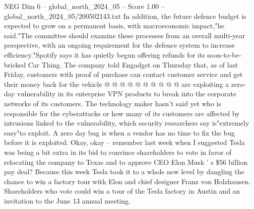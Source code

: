\begin{textsample}{NEG Dim 6 – global\_north\_2024\_05 – Score 1.00 – global\_north\_2024\_05/200502143.txt}
In addition, the future defence budget is expected to grow on a permanent basis, with macroeconomic impact,"he said."The committee should examine these processes from an overall multi-year perspective, with an ongoing requirement for the defence system to increase efficiency."Spotify says it has quietly begun offering refunds for its soon-to-be-bricked Car Thing.
The company told Engadget on Thursday that, as of last Friday, customers with proof of purchase can contact customer service and get their money back for the vehicle @ @ @ @ @ @ @ @ @ @ are exploiting a zero-day vulnerability in its enterprise VPN products to break into the corporate networks of its customers.
The technology maker hasn't said yet who is responsible for the cyberattacks or how many of its customers are affected by intrusions linked to the vulnerability, which security researchers say is"extremely easy"to exploit.
A zero day bug is when a vendor has no time to fix the bug before it is exploited.
Okay, okay -- remember last week when I suggested Tesla was being a bit extra in its bid to convince shareholders to vote in favor of relocating the company to Texas and to approve CEO Elon Musk ' s \$56 billion pay deal?
Because this week Tesla took it to a whole new level by dangling the chance to win a factory tour with Elon and chief designer Franz von Holzhausen.
Shareholders who vote could win a tour of the Tesla factory in Austin and an invitation to the June 13 annual meeting.

\end{textsample}
